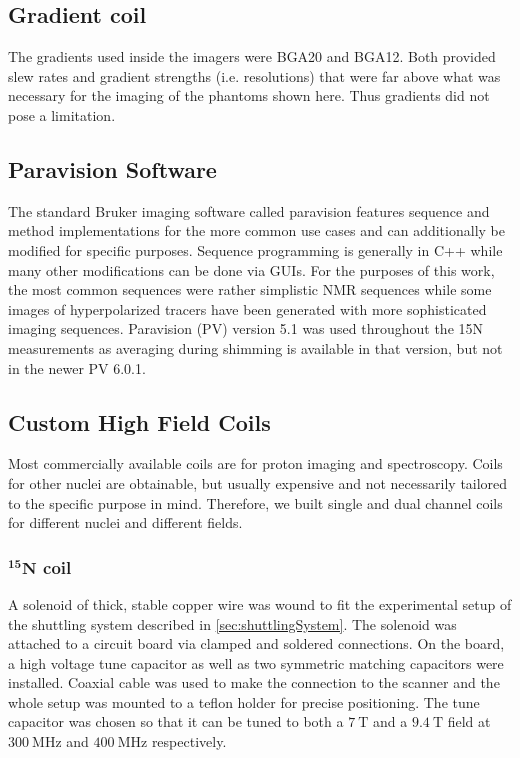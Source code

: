         \subsection{Gradient coil}
            The gradients used inside the imagers were BGA20 and BGA12. Both provided slew rates and gradient strengths (i.e. resolutions) that were far above what was necessary for the imaging of the phantoms shown here. Thus gradients did not pose a limitation.
        \subsection{Paravision Software}
            The standard Bruker imaging software called paravision features sequence and method implementations for the more common use cases and can additionally be modified for specific purposes. Sequence programming is generally in C++ while many other modifications can be done via GUIs.  For the purposes of this work, the most common sequences were rather simplistic NMR sequences while some images of hyperpolarized tracers have been generated with more sophisticated imaging sequences. Paravision (PV) version 5.1 was used throughout the 15N measurements as averaging during shimming is available in that version, but not in the newer PV 6.0.1.
        \subsection{Custom High Field Coils}
            Most commercially available coils are for proton imaging and spectroscopy. Coils for other nuclei are obtainable, but usually expensive and not necessarily tailored to the specific purpose in mind. Therefore, we built single and dual channel coils for different nuclei and different fields.
            \subsubsection{$\mathbf{^{15} N}$ coil}
                A solenoid of thick, stable copper wire was wound to fit the experimental setup of the shuttling system described in \ref{sec:shuttlingSystem}. The solenoid was attached to a circuit board via clamped and soldered connections. On the board, a high voltage tune capacitor as well as two symmetric matching capacitors were installed. Coaxial cable was used to make the connection to the scanner and the whole setup was mounted to a teflon holder for precise positioning.  The tune capacitor was chosen so that it can be tuned to both a $\SI{7}{\tesla}$ and a $\SI{9.4}{\tesla}$ field at $\SI{300}{\MHz}$ and $\SI{400}{\MHz}$ respectively.  
